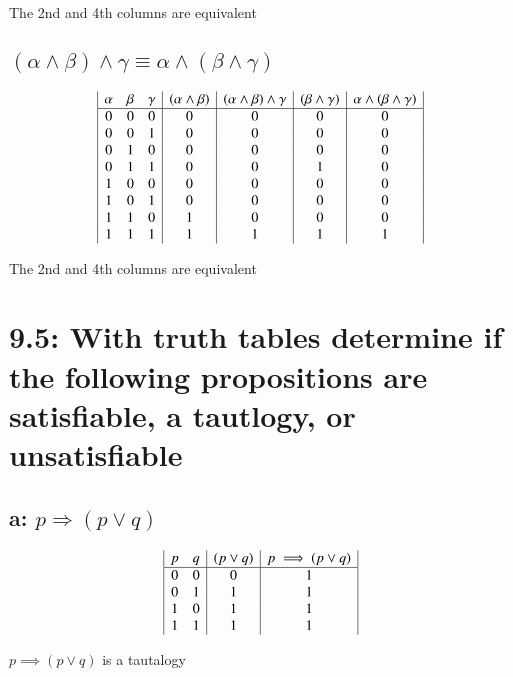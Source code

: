 \documentclass{article}
\begin{document}
The 2nd and 4th columns are equivalent 
\subsection*{$(\alpha \wedge \beta) \wedge \gamma \equiv \alpha \wedge (\beta \wedge \gamma)$}
\begin{displaymath}
  \begin{array}{|c c c|c|c|c|c|}
    \alpha & \beta & \gamma & (\alpha \land \beta) & (\alpha \land \beta) \land \gamma & (\beta \land \gamma) & \alpha \land (\beta \land \gamma)\\
    \hline
    0 & 0 & 0 & 0 & 0 & 0 & 0\\
    0 & 0 & 1 & 0 & 0 & 0 & 0\\
    0 & 1 & 0 & 0 & 0 & 0 & 0\\
    0 & 1 & 1 & 0 & 0 & 1 & 0\\
    1 & 0 & 0 & 0 & 0 & 0 & 0\\
    1 & 0 & 1 & 0 & 0 & 0 & 0\\
    1 & 1 & 0 & 1 & 0 & 0 & 0\\
    1 & 1 & 1 & 1 & 1 & 1 & 1\\
  \end{array}
\end{displaymath}

The 2nd and 4th columns are equivalent

\section*{9.5: With truth tables determine if the following propositions are satisfiable, a tautlogy, or unsatisfiable}

\subsection*{a: $p \Rightarrow (p \vee q)$}
\begin{displaymath}
  \begin{array}{|c c|c|c|}
    p & q & (p \lor q) & p \implies (p \lor q)\\
    \hline
    0 & 0 & 0 & 1\\
    0 & 1 & 1 & 1\\
    1 & 0 & 1 & 1\\
    1 & 1 & 1 & 1\\
  \end{array}
\end{displaymath}

$p \implies (p \lor q)$ is a tautalogy 
\end{document}
